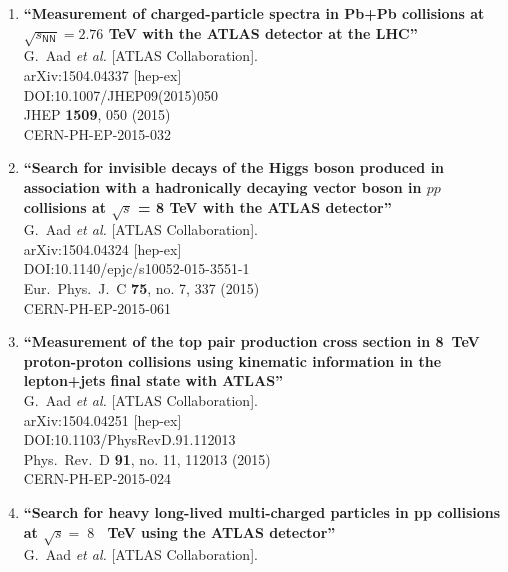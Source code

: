\documentclass{article}
\begin{document}
\begin{enumerate}
\item%
{\bf ``Measurement of charged-particle spectra in Pb+Pb collisions at $\sqrt{{s}_\mathsf{{NN}}} = 2.76$ TeV with the ATLAS detector at the LHC''}
  \\{}G.~Aad {\it et al.} [ATLAS Collaboration].
  \\{}arXiv:1504.04337 [hep-ex]
  \\{}DOI:10.1007/JHEP09(2015)050
  \\{}JHEP {\bf 1509}, 050 (2015)
  \\{}CERN-PH-EP-2015-032
\item%
{\bf ``Search for invisible decays of the Higgs boson produced in association with a hadronically decaying vector boson in $pp$ collisions at $\sqrt{s}$ = 8 TeV with the ATLAS detector''}
  \\{}G.~Aad {\it et al.} [ATLAS Collaboration].
  \\{}arXiv:1504.04324 [hep-ex]
  \\{}DOI:10.1140/epjc/s10052-015-3551-1
  \\{}Eur.\ Phys.\ J.\ C {\bf 75}, no. 7, 337 (2015)
  \\{}CERN-PH-EP-2015-061
\item%
{\bf ``Measurement of the top pair production cross section in 8 TeV proton-proton collisions using kinematic information in the lepton+jets final state with ATLAS''}
  \\{}G.~Aad {\it et al.} [ATLAS Collaboration].
  \\{}arXiv:1504.04251 [hep-ex]
  \\{}DOI:10.1103/PhysRevD.91.112013
  \\{}Phys.\ Rev.\ D {\bf 91}, no. 11, 112013 (2015)
  \\{}CERN-PH-EP-2015-024
\item%
{\bf ``Search for heavy long-lived multi-charged particles in pp collisions at $\sqrt{s}=\;8$  TeV using the ATLAS detector''}
  \\{}G.~Aad {\it et al.} [ATLAS Collaboration].

\end{enumerate}
\end{document}
